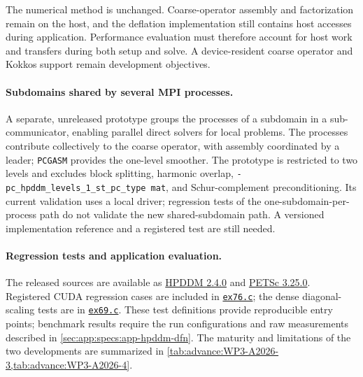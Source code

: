 The numerical method is unchanged. Coarse-operator assembly and
factorization remain on the host, and the deflation implementation still
contains host accesses during application.
Performance evaluation must therefore account for host work and transfers
during both setup and solve. A device-resident coarse operator and Kokkos
support remain development objectives.

\paragraph{Subdomains shared by several MPI processes.}
A separate, unreleased prototype groups the processes of a subdomain in a
sub-communicator, enabling parallel direct solvers for local problems.
The processes contribute collectively to the coarse operator, with assembly
coordinated by a leader; \texttt{PCGASM} provides the one-level smoother.
The prototype is restricted to two levels and excludes block splitting,
harmonic overlap, \texttt{-pc\_hpddm\_levels\_1\_st\_pc\_type mat}, and
Schur-complement preconditioning.
Its current validation uses a local driver; regression tests of the
one-subdomain-per-process path do not validate the new shared-subdomain path.
A versioned implementation reference and a registered test are still needed.

\paragraph{Regression tests and application evaluation.}
The released sources are available as
\href{https://github.com/hpddm/hpddm/tree/v2.4.0}{HPDDM 2.4.0} and
\href{https://github.com/petsc/petsc/tree/v3.25.0}{PETSc 3.25.0}.
Registered CUDA regression cases are included in
\href{https://github.com/petsc/petsc/blob/v3.25.0/src/ksp/ksp/tutorials/ex76.c}{\texttt{ex76.c}};
the dense diagonal-scaling tests are in
\href{https://github.com/petsc/petsc/blob/v3.25.0/src/mat/tests/ex69.c}{\texttt{ex69.c}}.
These test definitions provide reproducible entry points; benchmark results
require the run configurations and raw measurements described in
\cref{sec:app:specs:app-hpddm-dfn}.
The maturity and limitations of the two developments are summarized in
\cref{tab:advance:WP3-A2026-3,tab:advance:WP3-A2026-4}.

